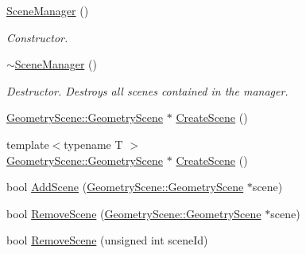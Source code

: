 \begin{DoxyCompactItemize}
\item 
\mbox{\label{class_geometry_engine_1_1_scene_manager_a12d0647ce4821a33c975235c0d8af7ec}} 
\mbox{\hyperlink{class_geometry_engine_1_1_scene_manager_a12d0647ce4821a33c975235c0d8af7ec}{Scene\+Manager}} ()
\begin{DoxyCompactList}\small\item\em Constructor. \end{DoxyCompactList}\item 
\mbox{\label{class_geometry_engine_1_1_scene_manager_a2a2742cac0f760bcc49269e6064fa629}} 
\mbox{\hyperlink{class_geometry_engine_1_1_scene_manager_a2a2742cac0f760bcc49269e6064fa629}{$\sim$\+Scene\+Manager}} ()
\begin{DoxyCompactList}\small\item\em Destructor. Destroys all scenes contained in the manager. \end{DoxyCompactList}\item 
\mbox{\hyperlink{class_geometry_engine_1_1_geometry_scene_1_1_geometry_scene}{Geometry\+Scene\+::\+Geometry\+Scene}} $\ast$ \mbox{\hyperlink{class_geometry_engine_1_1_scene_manager_aafc212a0eed6a49d411d06f03a73f943}{Create\+Scene}} ()
\item 
{\footnotesize template$<$typename T $>$ }\\\mbox{\hyperlink{class_geometry_engine_1_1_geometry_scene_1_1_geometry_scene}{Geometry\+Scene\+::\+Geometry\+Scene}} $\ast$ \mbox{\hyperlink{class_geometry_engine_1_1_scene_manager_acccb8a2f57b58cc96f77c7316b99248e}{Create\+Scene}} ()
\item 
bool \mbox{\hyperlink{class_geometry_engine_1_1_scene_manager_afc4e192e195a131efe932048a8d68404}{Add\+Scene}} (\mbox{\hyperlink{class_geometry_engine_1_1_geometry_scene_1_1_geometry_scene}{Geometry\+Scene\+::\+Geometry\+Scene}} $\ast$scene)
\item 
bool \mbox{\hyperlink{class_geometry_engine_1_1_scene_manager_a31890e580c47aceaeab795e8886bcf82}{Remove\+Scene}} (\mbox{\hyperlink{class_geometry_engine_1_1_geometry_scene_1_1_geometry_scene}{Geometry\+Scene\+::\+Geometry\+Scene}} $\ast$scene)
\item 
bool \mbox{\hyperlink{class_geometry_engine_1_1_scene_manager_ad8ca79bfce997398df387dd42d6e4312}{Remove\+Scene}} (unsigned int scene\+Id)
\item 

\end{DoxyCompactItemize}
